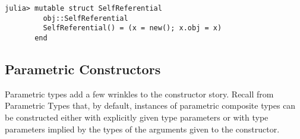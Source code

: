 \documentclass[
]{article}
\begin{document}
\begin{verbatim}
julia> mutable struct SelfReferential
         obj::SelfReferential
         SelfReferential() = (x = new(); x.obj = x)
       end
\end{verbatim}

\hypertarget{parametric-constructors}{%
\subsection{Parametric Constructors}\label{parametric-constructors}}

Parametric types add a few wrinkles to the constructor story. Recall
from Parametric Types that, by default, instances of parametric
composite types can be constructed either with explicitly given type
parameters or with type parameters implied by the types of the arguments
given to the constructor.
\end{document}
